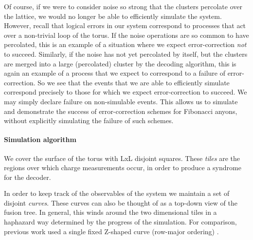 \documentclass[aps, prl, letterpaper, twocolumn, superscriptaddress, notitlepage]{revtex4-1}
\begin{document}

Of course, if we were to consider noise so strong that the clusters percolate over the lattice, we would no longer be able to efficiently simulate the system. However, recall that logical errors in our system correspond to processes that act over a non-trivial loop of the torus. If the noise operations are so common to have percolated, this is an example of a situation where we expect error-correction \emph{not} to succeed. Similarly, if the noise has not yet percolated by itself, but the clusters are merged into a large (percolated) cluster by the decoding algorithm, this is again an example of a process that we expect to correspond to a failure of error-correction. So we see that the events that we are able to efficiently simulate correspond precisely to those for which we expect error-correction to succeed. We may simply declare failure on non-simulable events. This allows us to simulate and demonstrate the success of error-correction schemes for Fibonacci anyons, without explicitly simulating the failure of such schemes.

\paragraph{Simulation algorithm}

We cover the surface of the torus with LxL disjoint squares. These {\it tiles} are the regions over which
charge measurements occur, in order to produce a syndrome for the decoder.

In order to keep track of the observables of the system we maintain a set of disjoint {\it curves}. These curves can also be thought of as a top-down view of the fusion tree. In general, this winds around the two dimensional tiles in a haphazard way determined by the progress of the simulation. For comparison, previous work used a single fixed Z-shaped curve (row-major ordering) \cite{Brell2013}.
\end{document}
